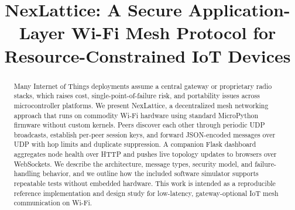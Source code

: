 \documentclass[conference]{IEEEtran}
\begin{document}
\title{NexLattice: A Secure Application-Layer Wi-Fi Mesh Protocol for Resource-Constrained IoT Devices}

\author{
\and
{}
\and
{}
\and
\and
{}
\and
{}
}

\maketitle

\begin{abstract}
Many Internet of Things deployments assume a central gateway or proprietary radio stacks, which raises cost, single-point-of-failure risk, and portability issues across microcontroller platforms. We present NexLattice, a decentralized mesh networking approach that runs on commodity Wi-Fi hardware using standard MicroPython firmware without custom kernels. Peers discover each other through periodic UDP broadcasts, establish per-peer session keys, and forward JSON-encoded messages over UDP with hop limits and duplicate suppression. A companion Flask dashboard aggregates node health over HTTP and pushes live topology updates to browsers over WebSockets. We describe the architecture, message types, security model, and failure-handling behavior, and we outline how the included software simulator supports repeatable tests without embedded hardware. This work is intended as a reproducible reference implementation and design study for low-latency, gateway-optional IoT mesh communication on Wi-Fi.
\end{abstract}
\end{document}
